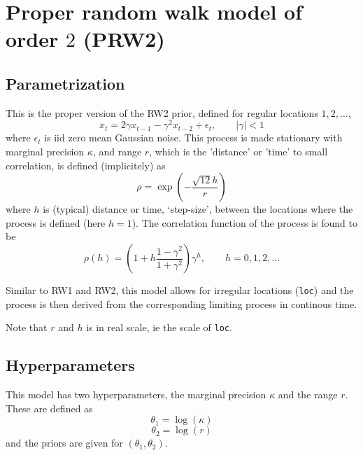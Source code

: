 \documentclass[a4paper,11pt]{article}
\begin{document}
\section*{Proper random walk model of order $2$ (PRW2)}

\subsection*{Parametrization}

This is the proper version of the RW2 prior, defined for regular
locations $1, 2, \ldots$,
\begin{displaymath}
    x_t = 2\gamma x_{t-1} - \gamma^{2} x_{t-2} + \epsilon_t, \qquad
    |\gamma| < 1
\end{displaymath}
where $\epsilon_t$ is iid zero mean Gaussian noise. This process is
made stationary with marginal precision $\kappa$, and range $r$, which is the
'distance' or 'time' to small correlation, is defined 
(implicitely) as
\begin{displaymath}
    \rho = \exp\left( - \frac{\sqrt{12} h}{r} \right)
\end{displaymath}
where $h$ is (typical) distance or time, `step-size', between the
locations where the process is defined (here $h=1$). The correlation
function of the process is found to be
\begin{displaymath}
    \rho(h) = \left(1  + h \frac{1-\gamma^{2}}{1+\gamma^{2}}\right)\gamma^{h},
    \qquad h=0, 1, 2, \ldots
\end{displaymath}

Similar to RW1 and RW2, this model allows for irregular locations
(\texttt{loc}) and the process is then derived from the corresponding
limiting process in continous time.

Note that $r$ and $h$ is in real scale, ie the scale of \texttt{loc}.

\subsection*{Hyperparameters}

This model has two hyperparameters, the marginal precision $\kappa$
and the range $r$. These are defined as
\begin{displaymath}
    \theta_1 = \log(\kappa)
\end{displaymath}
\begin{displaymath}
    \theta_2 = \log(r)
\end{displaymath}
and the priors are given for $(\theta_1, \theta_2)$.
\end{document}
